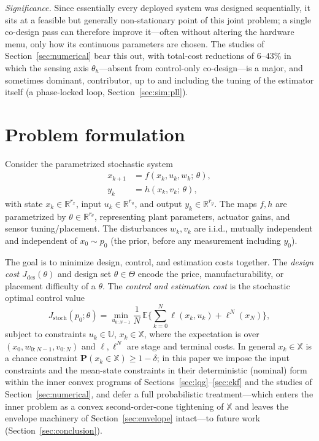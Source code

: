 \documentclass[twocolumn,amsthm]{autart}
\begin{document}
\emph{Significance.} Since essentially every deployed system was designed
sequentially, it sits at a feasible but generally non-stationary point of this
joint problem; a single co-design pass can therefore improve it---often without
altering the hardware menu, only how its continuous parameters are chosen. The
studies of Section~\ref{sec:numerical} bear this out, with total-cost reductions
of $6$--$43\%$ in which the sensing axis $\theta_h$---absent from control-only
co-design---is a major, and sometimes dominant, contributor, up to and including
the tuning of the estimator itself (a phase-locked loop, Section~\ref{sec:sim:pll}).

\section{Problem formulation}\label{sec:formulation}

Consider the parametrized stochastic system
\begin{subequations}\label{eq:ss}
\begin{align}
x_{k+1} &= f(x_k, u_k, w_k;\, \theta), \label{eq:ss-state}\\
y_k     &= h(x_k, v_k;\, \theta), \label{eq:ss-output}
\end{align}
\end{subequations}
with state $x_k \in \mathbb{R}^{r_x}$, input $u_k \in \mathbb{R}^{r_u}$, and
output $y_k \in \mathbb{R}^{r_y}$. The maps $f, h$ are parametrized by
$\theta \in \mathbb{R}^{r_\theta}$, representing plant parameters, actuator
gains, and sensor tuning/placement. The disturbances $w_k, v_k$ are i.i.d.,
mutually independent and independent of $x_0 \sim p_0$ (the prior, before any
measurement including $y_0$).

The goal is to minimize design, control, and estimation costs together. The
\emph{design cost} $J_{\mathrm{des}}(\theta)$ and design set $\theta \in \Theta$
encode the price, manufacturability, or placement difficulty of a $\theta$. The
\emph{control and estimation cost} is the stochastic optimal control value
\begin{equation}\label{eq:Jstoch}
J_{\mathrm{stoch}}(p_0;\theta) = \min_{u_{0:N-1}} \frac{1}{N}\,
\mathbb{E}\Big\{ \sum_{k=0}^{N} \ell(x_k,u_k) + \ell^N(x_N) \Big\},
\end{equation}
subject to constraints $u_k \in \mathbb{U}$, $x_k \in \mathbb{X}$, where
the expectation is over $(x_0, w_{0:N-1}, v_{0:N})$ and $\ell, \ell^N$ are stage
and terminal costs. In general
$x_k \in \mathbb{X}$ is a chance constraint $\mathbf{P}(x_k\in\mathbb{X})\ge
1-\delta$; in this paper we impose the input constraints and the mean-state
constraints in their deterministic (nominal) form within the inner convex
programs of Sections~\ref{sec:lqg}--\ref{sec:ekf} and the studies of
Section~\ref{sec:numerical}, and defer a full probabilistic treatment---which
enters the inner problem as a convex second-order-cone tightening of
$\mathbb{X}$ and leaves the envelope machinery of Section~\ref{sec:envelope}
intact---to future work (Section~\ref{sec:conclusion}).
\end{document}
